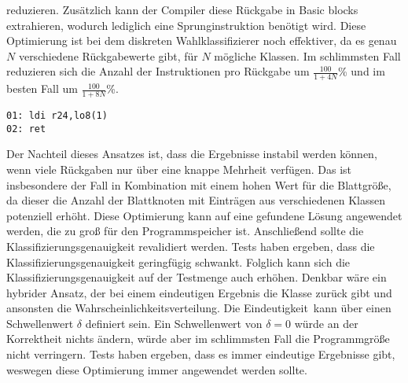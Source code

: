 reduzieren. Zusätzlich kann der Compiler diese Rückgabe in Basic blocks extrahieren, wodurch lediglich eine Sprunginstruktion benötigt wird. Diese Optimierung ist bei dem diskreten Wahlklassifizierer noch
effektiver, da es genau $N$ verschiedene Rückgabewerte gibt, für $N$ mögliche Klassen. Im schlimmsten Fall reduzieren sich die Anzahl der Instruktionen pro Rückgabe um $\frac{100}{1 + 4N}$\%
und im besten Fall um $\frac{100}{1 + 8N}$\%.
\begin{lstlisting}[label=lst:assemblyBlattReturnDiskret,caption={Beispiel des Assemblycodes der Rückgabe eines diskreten Wahlklassifizierers.}]
01: ldi r24,lo8(1)
02: ret
\end{lstlisting}
Der Nachteil dieses Ansatzes ist, dass die Ergebnisse instabil werden können, wenn viele Rückgaben nur über eine knappe Mehrheit verfügen. Das ist insbesondere der Fall in Kombination mit einem hohen Wert
für die Blattgröße, da dieser die Anzahl der Blattknoten mit Einträgen aus verschiedenen Klassen potenziell erhöht. Diese Optimierung kann auf eine gefundene Lösung angewendet werden, die zu groß für den
Programmspeicher ist. Anschließend sollte die Klassifizierungsgenauigkeit revalidiert werden. Tests haben ergeben, dass die Klassifizierungsgenauigkeit geringfügig schwankt. Folglich kann sich die
Klassifizierungsgenauigkeit auf der Testmenge auch erhöhen.
\newline
\newline
Denkbar wäre ein hybrider Ansatz, der bei einem eindeutigen Ergebnis die Klasse zurück gibt und ansonsten die Wahrscheinlichkeitsverteilung. Die \glqq Eindeutigkeit\grqq\ kann über
einen Schwellenwert $\delta$ definiert sein. Ein Schwellenwert von $\delta=0$ würde an der Korrektheit nichts ändern, würde aber im schlimmsten Fall die Programmgröße nicht verringern.
Tests haben ergeben, dass es immer eindeutige Ergebnisse gibt, weswegen diese Optimierung immer angewendet werden sollte.